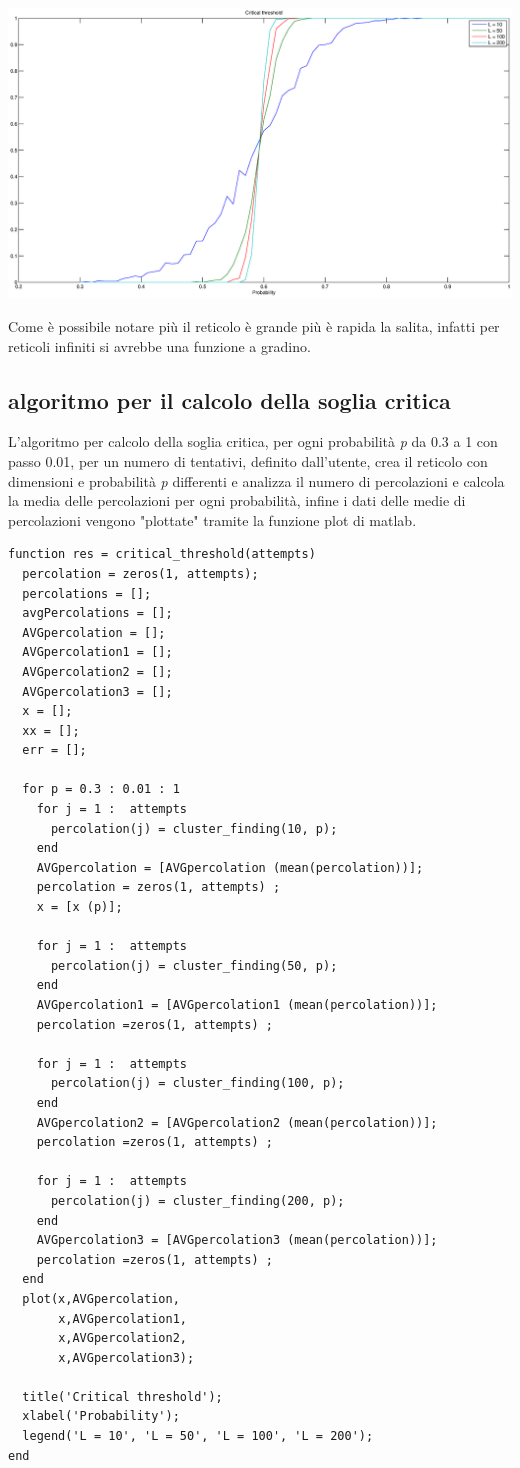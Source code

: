 \documentclass[10pt,a4paper]{article}
\begin{document}
\centerline{\includegraphics[scale=0.5]{pc.eps}}

Come è possibile notare più il reticolo è grande più è rapida la salita, infatti per reticoli infiniti si avrebbe una funzione a gradino.
\subsection{algoritmo per il calcolo della soglia critica}
L'algoritmo per calcolo della soglia critica, per ogni probabilità \emph{p} da 0.3 a 1 con passo 0.01, per un numero di tentativi, definito dall'utente, crea il reticolo con dimensioni e probabilità \emph{p} differenti e analizza il numero di percolazioni e calcola la media delle percolazioni per ogni probabilità, infine i dati delle medie di percolazioni vengono "plottate" tramite la funzione plot di matlab.\\

\begin{lstlisting}[caption={critical\_threshold.m},label=useless]
function res = critical_threshold(attempts)
  percolation = zeros(1, attempts);
  percolations = [];
  avgPercolations = [];
  AVGpercolation = [];
  AVGpercolation1 = [];
  AVGpercolation2 = [];
  AVGpercolation3 = [];
  x = [];
  xx = [];
  err = [];
    
  for p = 0.3 : 0.01 : 1
    for j = 1 :  attempts
      percolation(j) = cluster_finding(10, p);
    end
    AVGpercolation = [AVGpercolation (mean(percolation))];
    percolation = zeros(1, attempts) ;
    x = [x (p)];
        
    for j = 1 :  attempts
      percolation(j) = cluster_finding(50, p);
    end
    AVGpercolation1 = [AVGpercolation1 (mean(percolation))];
    percolation =zeros(1, attempts) ;
       
    for j = 1 :  attempts
      percolation(j) = cluster_finding(100, p);
    end
    AVGpercolation2 = [AVGpercolation2 (mean(percolation))];
    percolation =zeros(1, attempts) ;
        
    for j = 1 :  attempts
      percolation(j) = cluster_finding(200, p);
    end
    AVGpercolation3 = [AVGpercolation3 (mean(percolation))];
    percolation =zeros(1, attempts) ;
  end
  plot(x,AVGpercolation, 
       x,AVGpercolation1, 
       x,AVGpercolation2, 
       x,AVGpercolation3);
       
  title('Critical threshold');
  xlabel('Probability');
  legend('L = 10', 'L = 50', 'L = 100', 'L = 200');
end
\end{lstlisting}
\end{document}
